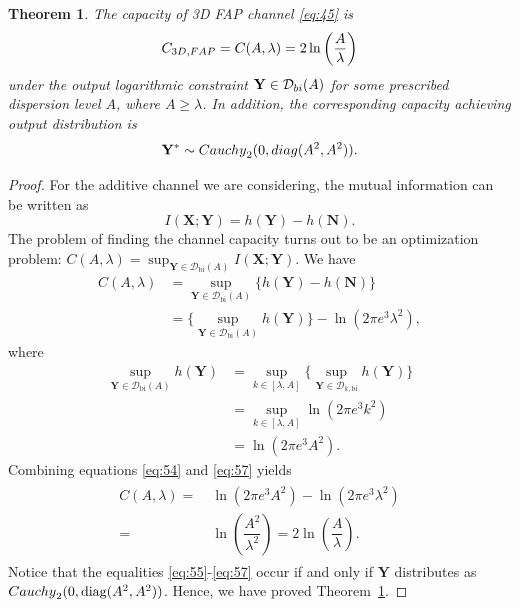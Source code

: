 \documentclass[10pt,a4paper]{amsart}
\newtheorem{thm}{Theorem}
\begin{document}
\begin{thm}
The capacity of 3D FAP channel \eqref{eq:45}  is
\begin{equation}
    C_{\rm{3D,FAP}}=C(A,\lambda)=2\ln\left(\dfrac{A}{\lambda}\right)
\end{equation}
under the output logarithmic constraint
$
\mathbf{Y}\in \mathcal{D}_{{\rm bi}}(A)
$
for some 
prescribed dispersion level $A$, where $A \geq \lambda$. In addition, the corresponding capacity achieving output distribution is
\begin{equation}
\mathbf{Y}^* \sim {\rm Cauchy}_2(0,{\rm diag}(A^2,A^2)).
\end{equation}
\label{thm:T2}
\end{thm}

\begin{proof}
For the additive channel we are considering, the mutual information can be written as
\begin{equation}
I(\mathbf{X};\mathbf{Y})=h(\mathbf{Y})-h(\mathbf{N}).
\end{equation}
The problem of finding the channel capacity turns out to be an optimization problem:
$
C(A,\lambda)=\sup_{\mathbf{Y}\in\mathcal{D}_{\text{bi}}(A)} I(\mathbf{X};\mathbf{Y}).
$
We have
\begin{align}
    C(A,\lambda)
    &=\sup_{\mathbf{Y} \in \mathcal{D}_{\text{bi}}(A)} \Big\{h(\mathbf{Y} ) - h(\mathbf{N} )\Big\}\\
    &=\Big\{\sup_{\mathbf{Y} \in \mathcal{D}_{\text{bi}}(A)} h(\mathbf{Y} )\Big\} - \ln(2\pi e^3\lambda^2), \label{eq:54}
\end{align}
where
\begin{align}
    \sup_{\mathbf{Y} \in \mathcal{D}_{\text{bi}}(A)} h(\mathbf{Y})
    &=
    \sup_{k\in[\lambda,A]}
    \Big\{ \sup_{\mathbf{Y}\in \mathcal{D}_{k,\text{bi}}} h(\mathbf{Y}) \Big\}\label{eq:55}\\
    &=
    \sup_{k\in[\lambda,A]}
    \ln(2\pi e^3 k^2) \label{eq:56}\\
    &= \ln(2\pi e^3 A^2). \label{eq:57}
\end{align}
Combining equations \eqref{eq:54} and \eqref{eq:57} yields
\begin{align}
\begin{split}
C(A,\lambda)
=&\ \ln(2\pi e^3 A^2) - \ln(2\pi e^3 \lambda^2)\\
=&\ \ln\left(\dfrac{A^2}{\lambda^2}\right)
=2\ln\left(\dfrac{A}{\lambda}\right).
\end{split}
\end{align}
Notice that the equalities \eqref{eq:55}-\eqref{eq:57} occur if and only if $\mathbf{Y}$ distributes as ${\rm Cauchy}_2(0,\text{diag}(A^2,A^2))$. Hence, we have proved Theorem~\ref{thm:T2}.
\end{proof}
\end{document}
